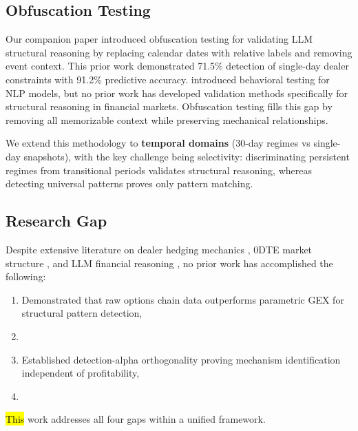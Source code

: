 \documentclass[jrfm,article,accept,moreauthors,pdftex]{Definitions/mdpi}
\begin{document}
\subsection{Obfuscation Testing}

Our companion paper \citep{regan2025obfuscation} introduced obfuscation testing for validating LLM structural reasoning by replacing calendar dates with relative labels and removing event context. This prior work demonstrated 71.5\% detection of single-day dealer constraints with 91.2\% predictive accuracy. \citet{ribeiro2020beyond} introduced behavioral testing for NLP models, but no prior work has developed validation methods specifically for structural reasoning in financial markets. Obfuscation testing fills this gap by removing all memorizable context while preserving mechanical relationships.

We extend this methodology to \textbf{temporal domains} (30-day regimes vs single-day snapshots), with the key challenge being selectivity: discriminating persistent regimes from transitional periods validates structural reasoning, whereas detecting universal patterns proves only pattern matching.

\subsection{Research Gap}

Despite extensive literature on dealer hedging mechanics \citep{ni2005stock,garleanu2009demand}, 0DTE market structure \citep{dim2023odtes,adams2025zerodte}, and LLM financial reasoning \citep{lopez2023can,lopezlira2025memorization}, no prior work has accomplished the following:
\begin{enumerate}
\item Demonstrated that raw options chain data outperforms parametric GEX for structural pattern detection,
\item {}
\item Established detection-alpha orthogonality proving mechanism identification independent of profitability,
\item {}
\end{enumerate}

\hl{This} %
 work addresses all four gaps within a unified framework.
\end{document}
